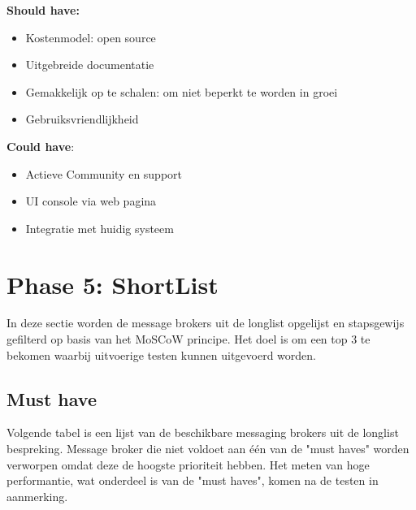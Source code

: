 \textbf{Should have:}
\begin{itemize}
  \item Kostenmodel: open source 
  \item Uitgebreide documentatie
  \item Gemakkelijk op te schalen: om niet beperkt te worden in groei
  \item Gebruiksvriendlijkheid
\end{itemize}

\textbf{Could have}:
\begin{itemize}
  \item Actieve Community en support
  \item UI console via web pagina
  \item Integratie met huidig systeem
\end{itemize}

\newpage
\section{Phase 5: ShortList}
In deze sectie worden de message brokers uit de longlist opgelijst en stapsgewijs gefilterd op basis van het MoSCoW principe.
Het doel is om een top 3 te bekomen waarbij uitvoerige testen kunnen uitgevoerd worden.

\subsection{Must have}
Volgende tabel is een lijst van de beschikbare messaging brokers uit de longlist bespreking.
Message broker die niet voldoet aan één van de "must haves" worden verworpen omdat deze de hoogste prioriteit hebben. 
Het meten van hoge performantie, wat onderdeel is van de "must haves", komen na de testen in aanmerking.


